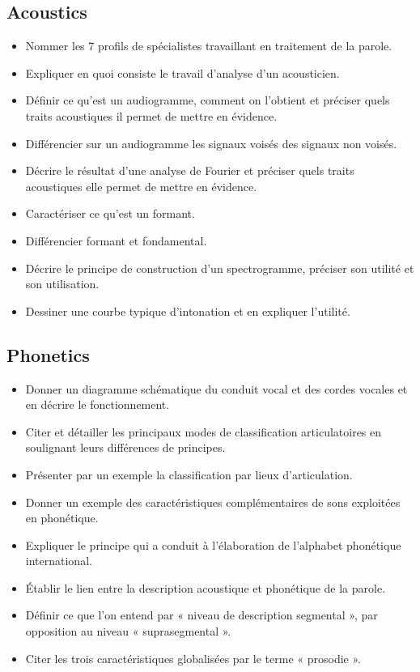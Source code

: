 \documentclass[letterpaper, 12pt]{article}
\begin{document}
	\subsection{Acoustics}
	\begin{itemize}
		\setlength{\itemsep}{0pt}		
		\setlength{\parskip}{0pt}		
		\setlength{\parsep}{0pt}	
		\item Nommer les 7 profils de spécialistes travaillant en traitement de la parole.
		\item Expliquer en quoi consiste le travail d'analyse d'un acousticien.
		\item Définir ce qu'est un audiogramme, comment on l'obtient et préciser quels traits 
		acoustiques il permet de mettre en évidence.
		\item Différencier sur un audiogramme les signaux voisés des signaux non voisés.
		\item Décrire le résultat d'une analyse de Fourier et préciser quels traits acoustiques elle 
		permet de mettre en évidence.
		\item Caractériser ce qu'est un formant.
		\item Différencier formant et fondamental.
		\item Décrire le principe de construction d'un spectrogramme, préciser son utilité et son utilisation.
		\item Dessiner une courbe typique d'intonation et en expliquer l'utilité.
		\end{itemize}
	\subsection{Phonetics}
	\begin{itemize}
		\setlength{\itemsep}{0pt}		
		\setlength{\parskip}{0pt}		
		\setlength{\parsep}{0pt}	
		\item Donner un diagramme schématique du conduit vocal et des cordes vocales et en décrire le 
		fonctionnement.
		\item Citer et détailler les principaux modes de classification articulatoires en soulignant leurs 
		différences de principes.
		\item Présenter par un exemple la classification par lieux d'articulation.
		\item Donner un exemple des caractéristiques complémentaires de sons exploitées en phonétique.
		\item Expliquer le principe qui a conduit à l'élaboration de l'alphabet phonétique international.
		\item Établir le lien entre la description acoustique et phonétique de la parole.
		\item Définir ce que l'on entend par « niveau de description segmental », par opposition au niveau
		« suprasegmental ».
		\item Citer les trois caractéristiques globalisées par le terme « prosodie ».
	\end{itemize}
\end{document}
